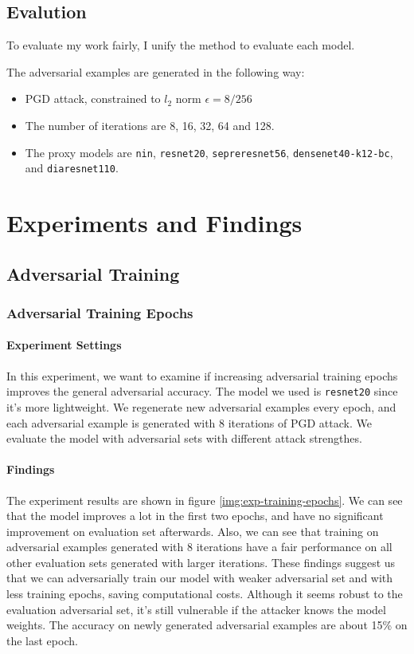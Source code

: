 \documentclass{article}
\begin{document}
\subsection{Evalution}
\label{section:evaluation}
To evaluate my work fairly, I unify the method to evaluate each model.

The adversarial examples are generated in the following way:
\begin{itemize}
  \item PGD attack, constrained to $l_2$ norm $\epsilon = 8 / 256$
  \item The number of iterations are 8, 16, 32, 64 and 128.
  \item The proxy models are \texttt{nin}, \texttt{resnet20}, \texttt{sepreresnet56},
  \texttt{densenet40-k12-bc}, and \texttt{diaresnet110}.
\end{itemize}

\section{Experiments and Findings}

\subsection{Adversarial Training}

\subsubsection{Adversarial Training Epochs}
\paragraph{Experiment Settings} In this experiment, we want to examine if increasing adversarial
training epochs improves the general adversarial accuracy. The model we used is \texttt{resnet20}
since it's more lightweight. We regenerate new adversarial examples every epoch, and each
adversarial example is generated with 8 iterations of PGD attack. We evaluate the model with
adversarial sets with different attack strengthes.

\paragraph{Findings} The experiment results are shown in figure \ref{img:exp-training-epochs}. We
can see that the model improves a lot in the first two epochs, and have no significant improvement
on evaluation set afterwards. Also, we can see that training on adversarial examples generated with
8 iterations have a fair performance on all other evaluation sets generated with larger iterations.
These findings suggest us that we can adversarially train our model with weaker adversarial set and
with less training epochs, saving computational costs. Although it seems robust to the evaluation
adversarial set, it's still vulnerable if the attacker knows the model weights. The accuracy on
newly generated adversarial examples are about 15\% on the last epoch.
\end{document}
